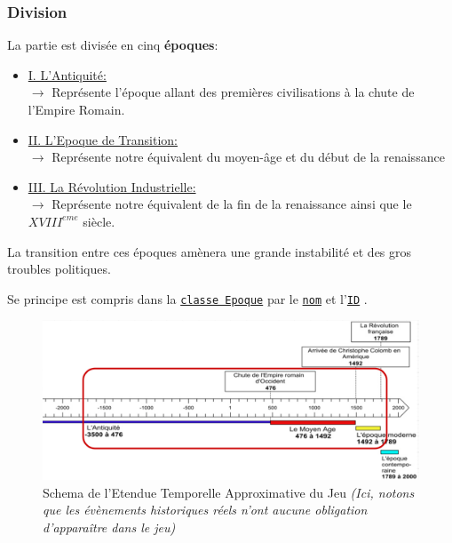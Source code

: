 \documentclass{article}
\newcommand{\ulcolor}[2][class]{\setulcolor{#1}\ul{#2}}
\newcommand{\ulcolor}[2][var]{\setulcolor{#1}\ul{#2}}
\newcommand{\ulcolor}[2][func]{\setulcolor{#1}\ul{#2}}
\newcommand*{\mybox}[2]{\colorbox{#1!30}{\parbox{.98\linewidth}{#2}}}
\newcommand\tab[1][0.5cm]{\hspace*{#1}}
\newcommand{\genbox}[1]{\mybox{verylightgray}{#1}}
\newcommand{\class}[1]{\texttt{\textcolor{codeColour}{\ulcolor[class]{#1}}}}
\newcommand{\var}[1]{\texttt{\textcolor{codeColour}{\ulcolor[var]{#1}}}}
\begin{document}
            \subsubsection{Division}
                La partie est divisée en cinq \textbf{époques}:
                    \begin{itemize}
                        \item \underline{I. L'Antiquité: } \\
                            $\rightarrow$ Représente l'époque allant des premières civilisations à la chute de l'Empire Romain.
                        \item \underline{II. L'Epoque de Transition: } \\
                            $\rightarrow$ Représente notre équivalent du moyen-âge et du début de la renaissance
                        \item \underline{III. La Révolution Industrielle: } \\
                            $\rightarrow$ Représente notre équivalent de la fin de la renaissance ainsi que le $XVIII^{eme}$ siècle.
                    \end{itemize}
                La transition entre ces époques amènera une grande instabilité et des gros troubles politiques. \\
                
                \tab \genbox{
                        Se principe est compris dans la \class{classe Epoque} par le \var{nom} et l'\var{ID} .
                    }

                \begin{figure}[h]
                    \centering
                        \includegraphics[scale=0.4]{schema_frise_chronologique.png}
                        \caption{Schema de l'Etendue Temporelle Approximative du Jeu \textit{(Ici, notons que les évènements historiques réels n'ont aucune obligation d'apparaître dans le jeu)}}
                        \label{fig:x photosysteme}
                \end{figure}
                
\end{document}
